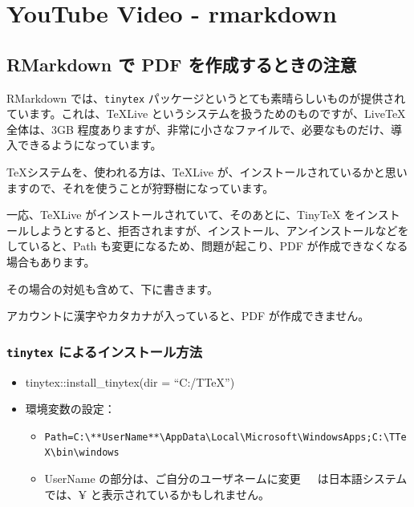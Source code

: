 \documentclass[
  xelatex, ja=standard]{bxjsbook}
\providecommand{\tightlist}{%
  \setlength{\itemsep}{0pt}\setlength{\parskip}{0pt}}
\theoremstyle{definition}
\theoremstyle{definition}
\theoremstyle{definition}
\theoremstyle{definition}
\theoremstyle{remark}
\begin{document}
\hypertarget{youtube-video---rmarkdown}{%
\section{YouTube Video - rmarkdown}\label{youtube-video---rmarkdown}}

\hypertarget{rmarkdown-ux3067-pdf-ux3092ux4f5cux6210ux3059ux308bux3068ux304dux306eux6ce8ux610f}{%
\subsection{RMarkdown で PDF を作成するときの注意}\label{rmarkdown-ux3067-pdf-ux3092ux4f5cux6210ux3059ux308bux3068ux304dux306eux6ce8ux610f}}

RMarkdown では、\texttt{tinytex} パッケージというとても素晴らしいものが提供されています。これは、TeXLive というシステムを扱うためのものですが、LiveTeX 全体は、3GB 程度ありますが、非常に小さなファイルで、必要なものだけ、導入できるようになっています。

\TeX システムを、使われる方は、TeXLive が、インストールされているかと思いますので、それを使うことが狩野樹になっています。

一応、TeXLive がインストールされていて、そのあとに、TinyTeX をインストールしようとすると、拒否されますが、インストール、アンインストールなどをしていると、Path も変更になるため、問題が起こり、PDF が作成できなくなる場合もあります。

その場合の対処も含めて、下に書きます。

アカウントに漢字やカタカナが入っていると、PDF が作成できません。

\hypertarget{tinytex-ux306bux3088ux308bux30a4ux30f3ux30b9ux30c8ux30fcux30ebux65b9ux6cd5}{%
\subsubsection{\texorpdfstring{\texttt{tinytex} によるインストール方法}{tinytex によるインストール方法}}\label{tinytex-ux306bux3088ux308bux30a4ux30f3ux30b9ux30c8ux30fcux30ebux65b9ux6cd5}}

\begin{itemize}
\tightlist
\item
  tinytex::install\_tinytex(dir = ``C:/TTeX'')
\item
  環境変数の設定：

  \begin{itemize}
  \tightlist
  \item
    \texttt{Path=C:\textbackslash{}**UserName**\textbackslash{}AppData\textbackslash{}Local\textbackslash{}Microsoft\textbackslash{}WindowsApps;C:\textbackslash{}TTeX\textbackslash{}bin\textbackslash{}windows}
  \item
    UserName の部分は、ご自分のユーザネームに変更　~は日本語システムでは、¥ と表示されているかもしれません。
  \end{itemize}
\end{itemize}
\end{document}
